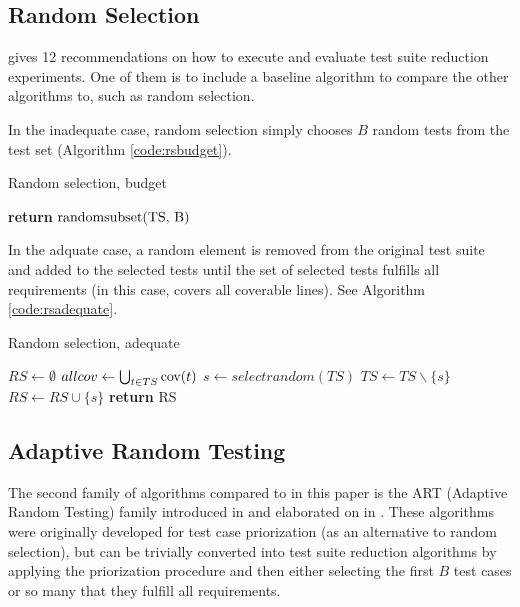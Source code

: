 \subsection{Random Selection}

\cite{khan2018systematic} gives 12 recommendations on how to execute and
evaluate test suite reduction experiments. One of them is to include a
baseline algorithm to compare the other algorithms to, such as random
selection.

In the inadequate case, random selection simply chooses $B$ random tests
from the test set (Algorithm \autoref{code:rsbudget}).


\begin{algorithm}
\caption[Random selection, budget]{Random selection, budget}\label{code:rsbudget}
\begin{algorithmic}
	\State \textbf{return} $\hbox{randomsubset(TS, B)}$
\EndFunction
\end{algorithmic}
\end{algorithm}

In the adquate case, a random element is removed from the original test
suite and added to the selected tests until the set of selected tests
fulfills all requirements (in this case, covers all coverable lines). See
Algorithm \autoref{code:rsadequate}.

\begin{algorithm}
\caption[Random selection, adequate]{Random selection, adequate}\label{code:rsadequate}
\begin{algorithmic}
	\State $RS \gets \emptyset$
	\State $allcov \gets \bigcup_{t \in TS} \hbox{cov}(t)$
		\State $s \gets selectrandom(TS)$
		\State $TS \gets TS \backslash \{s\}$
		\State $RS \gets RS \cup \{s\}$
	\EndWhile
	\State \textbf{return} RS
\EndFunction
\end{algorithmic}
\end{algorithm}

\subsection{Adaptive Random Testing}

The second family of algorithms compared to in this paper is the ART
(Adaptive Random Testing) family introduced in \cite{jiang2009adaptive}
and elaborated on in \cite{chen2010adaptive}. These algorithms were
originally developed for test case priorization (as an alternative
to random selection), but can be trivially converted into test suite
reduction algorithms by applying the priorization procedure and then
either selecting the first $B$ test cases or so many that they fulfill
all requirements.

